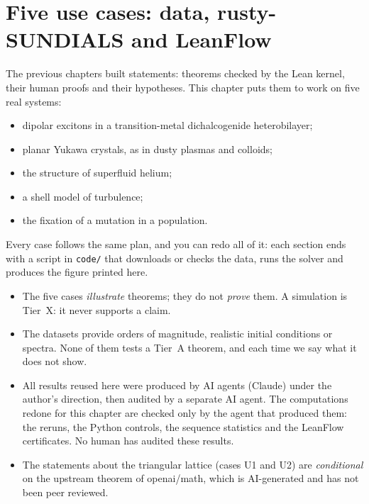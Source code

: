 \chapter{Five use cases: data, rusty-SUNDIALS and LeanFlow}\label{ch5:chapitre}\label{ch5:debut}

The previous chapters built statements: theorems checked by the Lean kernel, their human proofs and their
hypotheses. This chapter puts them to work on five real systems:
\begin{itemize}
\item dipolar excitons in a transition-metal dichalcogenide heterobilayer;
\item planar Yukawa crystals, as in dusty plasmas and colloids;
\item the structure of superfluid helium;
\item a shell model of turbulence;
\item the fixation of a mutation in a population.
\end{itemize}
Every case follows the same plan, and you can redo all of it: each section ends with a script in
\texttt{code/} that downloads or checks the data, runs the solver and produces the figure printed here.

\begin{warnbox}
\begin{itemize}
\item The five cases \emph{illustrate} theorems; they do not \emph{prove} them. A simulation is
Tier~X: it never supports a claim.
\item The datasets provide orders of magnitude, realistic initial conditions or spectra. None
of them tests a Tier~A theorem, and each time we say what it does not show.
\item All results reused here were produced by AI agents (Claude) under the author's direction,
then audited by a separate AI agent. The computations redone for this chapter are checked only by the agent that
produced them: the reruns, the Python controls, the sequence statistics and the LeanFlow certificates. No
human has audited these results.
\item The statements about the triangular lattice (cases U1 and U2) are \emph{conditional} on the upstream theorem
 of openai/math, which is AI-generated and has not been peer reviewed.
\end{itemize}
\end{warnbox}


